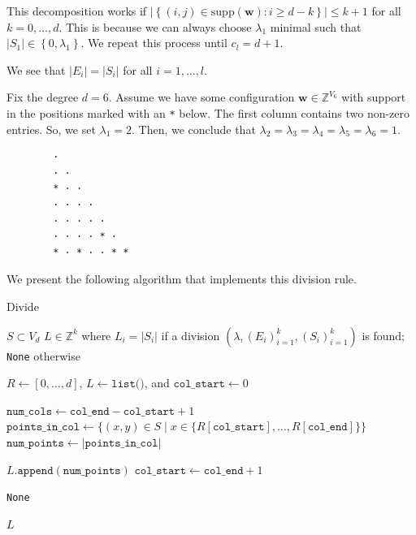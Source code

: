 \begin{remark}\label{rem:ksldmfiewonowiniew}
This decomposition works if \( \lvert \left\{ (i,j) \in \mathrm{supp}(\mathbf{w}) : i \geq d-k \right\} \rvert \leq k+1 \) for all \( k = 0, \dots, d \). This is because we can always choose \( \lambda_1  \) minimal such that \( \lvert S_1 \rvert \in \left\{ 0, \lambda_1 \right\} \). We repeat this process until \( c_l = d+1 \). 
\end{remark}

\begin{remark}
    We see that \( \lvert E_i \rvert = \lvert S_i \rvert \) for all \( i = 1, \dots, l \). 
\end{remark}

\begin{example}\label{ex:decomposition-nsjkfnje}
    Fix the degree \( d=6 \). Assume we have some configuration \( \mathbf w \in \mathbb{Z}^{V_6} \) with support in the positions marked with an \texttt{*} below. The first column contains two non-zero entries. So, we set \( \lambda_1 = 2 \). Then, we conclude that \( \lambda_2 = \lambda_3 = \lambda_4 = \lambda_5 = \lambda_6 = 1\).
    \begin{verbatim}
        · 
        · · 
        * · · 
        · · · · 
        · · · · · 
        · · · · * · 
        * · * · · * *
    \end{verbatim}
\end{example}

We present the following algorithm that implements this division rule.


\begin{algorithm}[H]
\caption{Divide}
\label{alg:divide}
\begin{algorithmic}[1]
\Require \( S \subset V_d \)
\Ensure \( L \in \mathbb{Z}^{k} \) where \( L_i = \lvert S_i \rvert \) if a division \( (\lambda, (E_i)_{i=1}^k, (S_i)_{i=1}^k) \) is found; \texttt{None} otherwise

\State $R \gets [0, \dots, d]$, $L \gets \texttt{list()}$, and $\texttt{col\_start} \gets 0$

    \State $\texttt{num\_cols} \gets \texttt{col\_end} - \texttt{col\_start} + 1$
    \State $\texttt{points\_in\_col} \gets \{(x,y) \in S \mid x \in \{R[\texttt{col\_start}], \dots,  R[\texttt{col\_end}] \} \}$
    \State $\texttt{num\_points} \gets |\texttt{points\_in\_col}|$

        \State $L.\texttt{append}(\texttt{num\_points})$
        \State $\texttt{col\_start} \gets \texttt{col\_end} + 1$
    \EndIf
\EndFor

    \State \Return \texttt{None}
\EndIf

\State \Return $L$
\end{algorithmic}
\end{algorithm}

